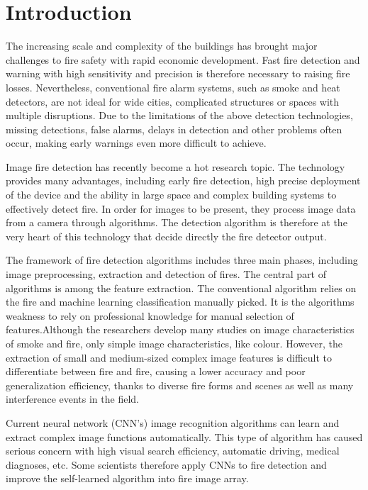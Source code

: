 
\chapter{Introduction} %
\label{Chapter1}

The increasing scale and complexity of the buildings
 has brought major challenges to fire safety with 
 rapid economic development. Fast fire detection 
 and warning with high sensitivity and precision 
 is therefore necessary to raising fire losses. 
 Nevertheless, conventional fire alarm systems, 
 such as smoke and heat detectors, are not ideal 
 for wide cities, complicated structures or spaces 
 with multiple disruptions. Due to the limitations 
 of the above detection technologies, missing 
 detections, false alarms, delays in detection 
 and other problems often occur, making early warnings 
 even more difficult to achieve.

 Image fire detection has recently become a hot research topic. 
 The technology provides many advantages, including early fire 
 detection, high precise deployment of the device and the 
 ability in large space and complex building systems to 
 effectively detect fire. In order for images to be present, 
 they process image data from a camera through algorithms. 
 The detection algorithm is therefore at the very heart of 
 this technology that decide directly the fire detector output.

 The framework of fire detection algorithms includes three 
 main phases, including image preprocessing, extraction 
 and detection of fires. The central part of algorithms 
 is among the feature extraction. The conventional algorithm 
 relies on the fire and machine learning classification manually 
 picked. It is the algorithms weakness to rely on professional 
 knowledge for manual selection of features.Although the 
 researchers develop many studies on image characteristics 
 of smoke and fire, only simple image characteristics, 
 like colour. However, the extraction of small and medium-sized 
 complex image features is difficult to differentiate between 
 fire and fire, causing a lower accuracy and poor 
 generalization efficiency, thanks to diverse fire forms and 
 scenes as well as many interference events in the field.

 Current neural network (CNN's) image recognition algorithms 
 can learn and extract complex image functions automatically. 
 This type of algorithm has caused serious concern with high 
 visual search efficiency, automatic driving, medical diagnoses, 
 etc. Some scientists therefore apply CNNs to fire detection and 
 improve the self-learned algorithm into fire image array.


